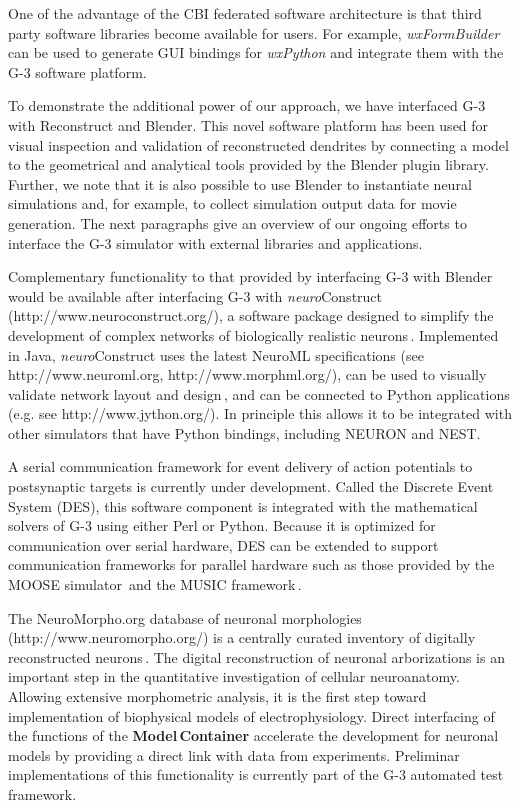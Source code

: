 \documentclass[12pt]{article}
\begin{document}
One of the advantage of the CBI federated software architecture is
that third party software libraries become available for users.  For
example, {\it wxFormBuilder} can be used to generate GUI bindings for
{\it wxPython} and integrate them with the G-3 software platform.

To demonstrate the additional power of our approach, we have
interfaced G-3 with Reconstruct and Blender. This novel software
platform has been used for visual inspection and validation of
reconstructed dendrites by connecting a model to the geometrical and
analytical tools provided by the Blender plugin library.  Further, we
note that it is also possible to use Blender to instantiate neural
simulations and, for example, to collect simulation output data for
movie generation.  The next paragraphs give an overview of our ongoing
efforts to interface the G-3 simulator with external libraries and
applications.

Complementary functionality to that provided by interfacing G-3 with
Blender would be available after interfacing G-3 with {\it
  neuro}Construct (http://www.neuroconstruct.org/), a software package
designed to simplify the development of complex networks of
biologically realistic neurons\,\cite{gleeson05:_build_networ_model,
  gleeson07}.  Implemented in Java, {\it neuro}Construct uses the
latest NeuroML specifications (see http://www.neuroml.org,
http://www.morphml.org/), can be used to visually validate network
layout and design\,\cite{crook07:_morph}, and can be connected to
Python applications (e.g.  see http://www.jython.org/). In principle
this allows it to be integrated with other simulators that have Python
bindings, including NEURON and NEST.

A serial communication framework for event delivery of action
potentials to postsynaptic targets is currently under development.
Called the Discrete Event System (DES), this software component is
integrated with the mathematical solvers of G-3 using either Perl or
Python.  Because it is optimized for communication over serial
hardware, DES can be extended to support communication frameworks for
parallel hardware such as those provided by the MOOSE
simulator\,\cite{ray08:_pymoos} and the MUSIC
framework\,\cite{ekeberg08:_music_multis_coord}.

The NeuroMorpho.org database of neuronal morphologies
(http://www.neuromorpho.org/) is a centrally curated inventory of
digitally reconstructed neurons\,\cite{ascoli06:_mobil}.  The digital
reconstruction of neuronal arborizations is an important step in the
quantitative investigation of cellular neuroanatomy.  Allowing
extensive morphometric analysis, it is the first step toward
implementation of biophysical models of electrophysiology.  Direct
interfacing of the functions of the {\bf Model\,Container} accelerate
the development for neuronal models by providing a direct link with
data from experiments.  Preliminar implementations of this
functionality is currently part of the G-3 automated test framework.
\end{document}
